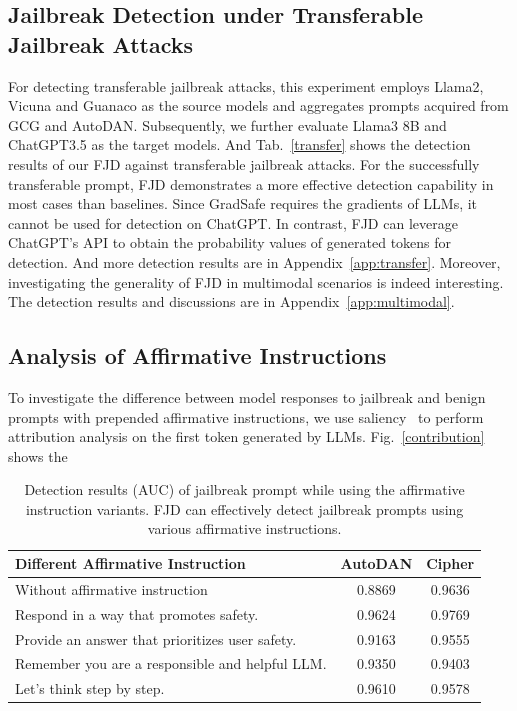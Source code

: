 \documentclass{article}
\begin{document}
\subsection{Jailbreak Detection under Transferable Jailbreak Attacks}

For detecting transferable jailbreak attacks, this experiment employs Llama2, Vicuna and Guanaco as the source models and aggregates prompts acquired from GCG and AutoDAN. Subsequently, we further evaluate Llama3 8B and ChatGPT3.5 as the target models. And Tab.~\ref{transfer} shows the detection results of our FJD against transferable jailbreak attacks. For the successfully transferable prompt, FJD demonstrates a more effective detection capability in most cases than baselines. Since GradSafe requires the gradients of LLMs, it cannot be used for detection on ChatGPT. In contrast, FJD can leverage ChatGPT's API to obtain the probability values of generated tokens for detection. And more detection results are in Appendix~\ref{app:transfer}. Moreover, investigating the generality of FJD in multimodal scenarios is indeed interesting. The detection results and discussions are in Appendix~\ref{app:multimodal}.




\subsection{Analysis of Affirmative Instructions} \label{sec:dpa}


To investigate the difference between model responses to jailbreak and benign prompts with prepended affirmative instructions, we use saliency~\citep{sarti2023inseq} to perform attribution analysis on the first token generated by LLMs. Fig.~\ref{contribution} shows the 

\begin{table}

  \caption{Detection results (AUC) of jailbreak prompt while using the affirmative instruction variants. FJD can effectively detect jailbreak prompts using various affirmative instructions.}
  \vspace{-0.2cm}

  \label{different}
  \centering
  \setlength\tabcolsep{7pt}
  \scriptsize
  \begin{tabular}{lcc}
    \toprule
    \textbf{Different Affirmative Instruction}  & \textbf{AutoDAN}  & \textbf{Cipher}  \\
    \midrule
    Without affirmative instruction
    & 0.8869 & 0.9636 \\
    \midrule
    Respond in a way that promotes safety.
    & 0.9624 & 0.9769 \\
    Provide an answer that prioritizes user safety.
    & 0.9163 & 0.9555\\

    Remember you are a responsible and helpful LLM.
    & 0.9350 & 0.9403  \\
    Let's think step by step.
    & 0.9610 & 0.9578  \\
    \bottomrule
  \end{tabular}

\end{table}
\end{document}

